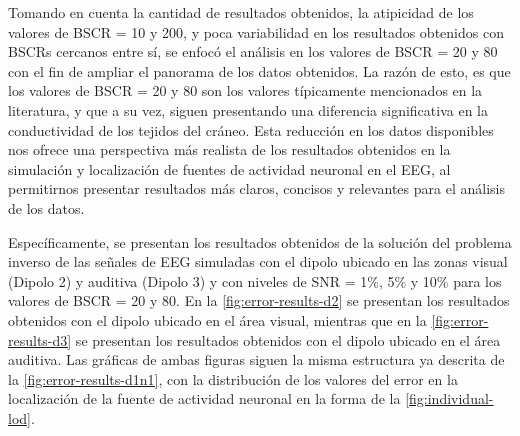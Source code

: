 Tomando en cuenta la cantidad de resultados obtenidos, la atipicidad de los valores de BSCR = 10 y 200, y poca variabilidad en los resultados obtenidos con BSCRs cercanos entre sí, se enfocó el análisis en los valores de BSCR = 20 y 80 con el fin de ampliar el panorama de los datos obtenidos.
La razón de esto, es que los valores de BSCR = 20 y 80 son los valores típicamente mencionados en la literatura, y que a su vez, siguen presentando una diferencia significativa en la conductividad de los tejidos del cráneo.
Esta reducción en los datos disponibles nos ofrece una perspectiva más realista de los resultados obtenidos en la simulación y localización de fuentes de actividad neuronal en el EEG, al permitirnos presentar resultados más claros, concisos y relevantes para el análisis de los datos.

Específicamente, se presentan los resultados obtenidos de la solución del problema inverso de las señales de EEG simuladas con el dipolo ubicado en las zonas visual (Dipolo 2) y auditiva (Dipolo 3) y con niveles de SNR = 1\%, 5\% y 10\% para los valores de BSCR = 20 y 80.
En la \cref{fig:error-results-d2} se presentan los resultados obtenidos con el dipolo ubicado en el área visual, mientras que en la \cref{fig:error-results-d3} se presentan los resultados obtenidos con el dipolo ubicado en el área auditiva.
Las gráficas de ambas figuras siguen la misma estructura ya descrita de la \cref{fig:error-results-d1n1}, con la distribución de los valores del error en la localización de la fuente de actividad neuronal en la forma de la \cref{fig:individual-lod}.

